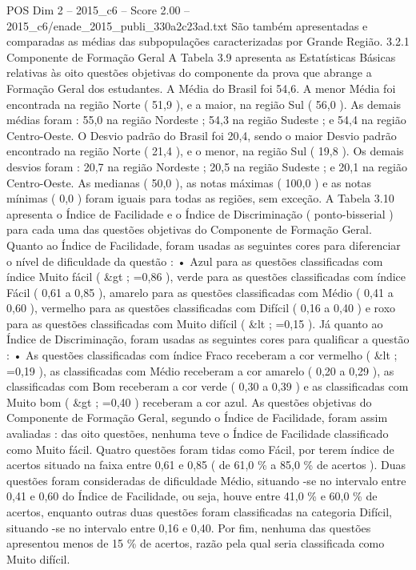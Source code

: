 \begin{textsample}{POS Dim 2 – 2015\_c6 – Score 2.00 – 2015\_c6/enade\_2015\_publi\_330a2c23ad.txt}
São também apresentadas e comparadas as médias das subpopulações caracterizadas por Grande Região. 3.2.1 Componente de Formação Geral A Tabela 3.9 apresenta as Estatísticas Básicas relativas às oito questões objetivas do componente da prova que abrange a Formação Geral dos estudantes.
A Média do Brasil foi 54,6.
A menor Média foi encontrada na região Norte ( 51,9 ), e a maior, na região Sul ( 56,0 ).
As demais médias foram : 55,0 na região Nordeste ; 54,3 na região Sudeste ; e 54,4 na região Centro-Oeste.
O Desvio padrão do Brasil foi 20,4, sendo o maior Desvio padrão encontrado na região Norte ( 21,4 ), e o menor, na região Sul ( 19,8 ).
Os demais desvios foram : 20,7 na região Nordeste ; 20,5 na região Sudeste ; e 20,1 na região Centro-Oeste.
As medianas ( 50,0 ), as notas máximas ( 100,0 ) e as notas mínimas ( 0,0 ) foram iguais para todas as regiões, sem exceção.
A Tabela 3.10 apresenta o Índice de Facilidade e o Índice de Discriminação ( ponto-bisserial ) para cada uma das questões objetivas do Componente de Formação Geral.
Quanto ao Índice de Facilidade, foram usadas as seguintes cores para diferenciar o nível de dificuldade da questão : • Azul para as questões classificadas com índice Muito fácil ( \&gt ; =0,86 ), verde para as questões classificadas com índice Fácil ( 0,61 a 0,85 ), amarelo para as questões classificadas com Médio ( 0,41 a 0,60 ), vermelho para as questões classificadas com Difícil ( 0,16 a 0,40 ) e roxo para as questões classificadas com Muito difícil ( \&lt ; =0,15 ).
Já quanto ao Índice de Discriminação, foram usadas as seguintes cores para qualificar a questão : • As questões classificadas com índice Fraco receberam a cor vermelho ( \&lt ; =0,19 ), as classificadas com Médio receberam a cor amarelo ( 0,20 a 0,29 ), as classificadas com Bom receberam a cor verde ( 0,30 a 0,39 ) e as classificadas com Muito bom ( \&gt ; =0,40 ) receberam a cor azul.
As questões objetivas do Componente de Formação Geral, segundo o Índice de Facilidade, foram assim avaliadas : das oito questões, nenhuma teve o Índice de Facilidade classificado como Muito fácil.
Quatro questões foram tidas como Fácil, por terem índice de acertos situado na faixa entre 0,61 e 0,85 ( de 61,0 \% a 85,0 \% de acertos ).
Duas questões foram consideradas de dificuldade Médio, situando -se no intervalo entre 0,41 e 0,60 do Índice de Facilidade, ou seja, houve entre 41,0 \% e 60,0 \% de acertos, enquanto outras duas questões foram classificadas na categoria Difícil, situando -se no intervalo entre 0,16 e 0,40.
Por fim, nenhuma das questões apresentou menos de 15 \% de acertos, razão pela qual seria classificada como Muito difícil.

\end{textsample}
